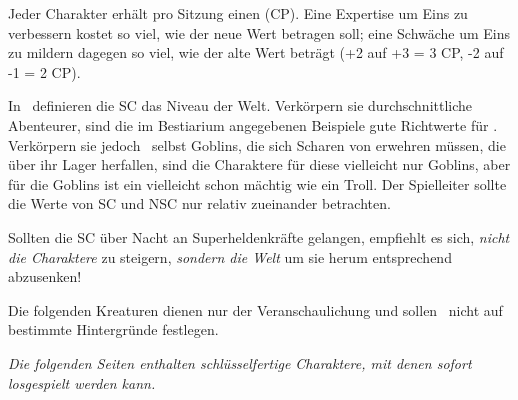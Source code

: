 \begin{multicols}{2}

Jeder Charakter erhält pro Sitzung einen  (CP). Eine Expertise um Eins zu verbessern kostet so viel, wie der neue Wert betragen soll; eine Schwäche um Eins zu mildern dagegen so viel, wie der alte Wert beträgt (+2 auf +3 = 3 CP, -2 auf -1 = 2 CP).

In \nipajin\ definieren die SC das Niveau der Welt. Verkörpern sie durchschnittliche Abenteurer, sind die im Bestiarium angegebenen Beispiele gute Richtwerte für . Verkörpern sie jedoch \zB\ selbst Goblins, die sich Scharen von  erwehren müssen, die über ihr Lager herfallen, sind die Charaktere für diese  vielleicht nur Goblins, aber für die Goblins ist ein  vielleicht schon mächtig wie ein Troll. Der Spielleiter sollte die Werte von SC und NSC nur relativ zueinander betrachten.

Sollten die SC über Nacht an Super\-hel\-den\-kräfte gelangen, empfiehlt es sich, \emph{nicht die Charaktere} zu steigern, \emph{sondern die Welt} um sie herum entsprechend abzusenken!


Die folgenden Kreaturen dienen nur der Veranschaulichung und sollen \nipajin\ nicht auf bestimmte Hintergründe festlegen. 


\end{multicols}

\vfill


\vspace*{1em}

{\noindent \centering \emph{Die folgenden Seiten enthalten schlüsselfertige Charaktere, mit denen sofort losgespielt werden kann.}

} 
